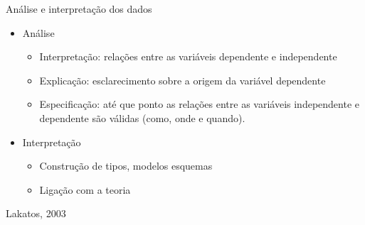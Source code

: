 \documentclass{beamer}
\begin{document}
\begin{frame}{Análise e interpretação dos dados}
  \begin{itemize}
  \item Análise
    \begin{itemize}
      \scriptsize
    \item Interpretação: relações entre as variáveis dependente e
      independente
    \item Explicação: esclarecimento sobre a origem da variável
      dependente
    \item Especificação: até que ponto as relações entre as variáveis
      independente e dependente são válidas (como, onde e quando).
    \end{itemize}
  \item Interpretação
    \begin{itemize}
      \scriptsize
    \item Construção de tipos, modelos esquemas
    \item Ligação com a teoria
    \end{itemize}
  \end{itemize}

  \vfill
  \scriptsize
  \hfill Lakatos, 2003
\end{frame}
\end{document}
